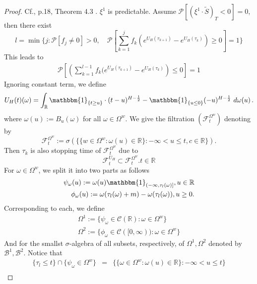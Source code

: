 \documentclass[a4paper, twoside, 11pt]{article}
\theoremstyle{definition}
\newcommand{\brkt}[1]{\left({#1} \right)}
\begin{document}
\begin{proof}
  Cf.\cite{chridito}, p.18, Theorem 4.3 . $\xi^1$ is predictable. %
  Assume ${\mathcal{P}}[(\xi^1 \cdot \tilde{S})_T < 0] = 0$, then there exist 
  $$
  l = \min \{ j: \mathcal{P}[f_j \neq 0] > 0,\hspace{1em} \mathcal{P}[\sum_{k=1}^{j} f_k (e^{U_H(\tau_{k+1})} - e^{U_H(\tau_k)})\ge 0]=1 \}
  $$
  This leads to
  \begin{eqnarray*}
	\mathcal{P} \left[\brkt{\sum_{k=1}^{l-1} f_k (e^{U_H(\tau_{k+1})} - e^{U_H(\tau_k)}} \le 0\right] = 1 
  \end{eqnarray*}
  Ignoring constant term, we define 
  $$
  U_H(t)(\omega) = \int_{\mathbb{R}} \mathbbm{1}_{\{t\ge u\}}\cdot (t-u)^{H-\frac{1}{2}} - \mathbbm{1}_{\{u\le 0\}} (-u)^{H-\frac{1}{2}} \, \mathop{d\omega(u)} .
  $$
  where $\omega(u) := B_u(\omega)$ for all $\omega \in \Omega^w$.
  We give the filtration $(\mathcal{F}_t^{\Omega^w})$ denoting by 
  $$
  \mathcal{F}_t^{\Omega^w} := \sigma(\{\{w \in \Omega^w : \omega(u) \in \mathbb{R}\} : -\infty < u \le t, c\in\mathbb{R}\}).
  $$
  Then $\tau_k$ is also stopping time of $\mathcal{F}_t^{\Omega^w}$ due to
  $$
  \mathcal{F}^{U_H}_t \subset \mathcal{F}_t^{\Omega^w}.	t \in \mathbb{R}
  $$
 For $\omega \in \Omega^w$, we split it into two parts as follows
 \begin{eqnarray*}
 \psi_{\omega}(u) := \omega(u)\mathbbm{1}_{(-\infty, \tau_l(\omega)]}, u\in \mathbb{R} \\
   \phi_{\omega}(u) := \omega(\tau_l(\omega) + m) - \omega(\tau_l(\omega)), u\ge 0.
 \end{eqnarray*}
Corresponding to each, we define
\begin{eqnarray*}
  \Omega^1 := \{\psi_{\omega} \in \mathcal{C}(\mathbb{R}) : \omega \in \Omega^w\}\\
  \Omega^2 := \{\phi_{\omega} \in \mathcal{C}([0, \infty)) : \omega \in \Omega^w\}
\end{eqnarray*}
And for the smallst $\sigma$-algebra of all subsets, respectively, of $\Omega^1, \Omega^2$ denoted by $\mathscr{B}^1, \mathscr{B}^2$.
Notice that
\begin{eqnarray*}
  \{\tau_l \le t\} \cap \{\psi_{\omega} \in \Omega^w\} &=& \{\{\omega \in \Omega^w : \omega(u) \in \mathbb{R}\} : -\infty < u \le t\}\\

\end{eqnarray*}
\end{proof}
\end{document}
